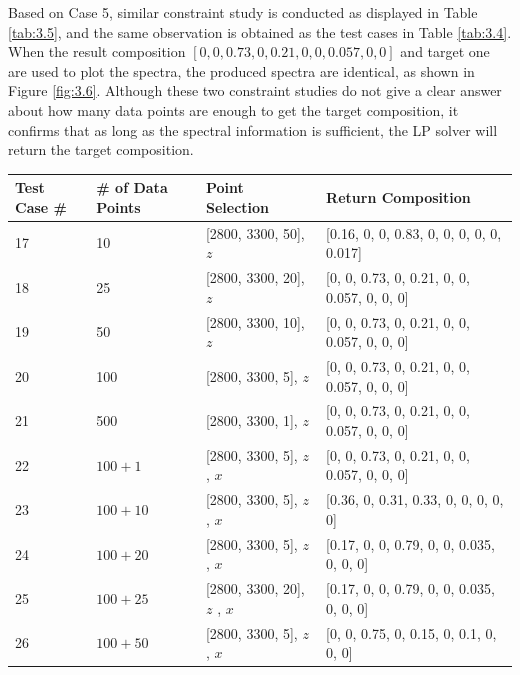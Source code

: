 Based on Case 5, similar constraint study is conducted as displayed in Table \ref{tab:3.5}, and the same observation is obtained as the test cases in Table \ref{tab:3.4}. When the result composition $[0, 0, 0.73, 0, 0.21,0, 0, 0.057, 0, 0]$ and target one are used to plot the spectra, the produced spectra are identical, as shown in Figure \ref{fig:3.6}. Although these two constraint studies do not give a clear answer about how many data points are enough to get the target composition, it confirms that as long as the spectral information is sufficient, the LP solver will return the target composition.
\begin{table} \small
\begin{center} 
{\def\arraystretch{1.5}
\begin{tabular}{| p{1cm} | p{2cm} | p{4cm}  | l |}
\hline
Test Case \# & \# of Data Points & Point Selection & Return Composition \\ \hline
17 & 10 & [2800, 3300, 50], $z$ & [0.16, 0, 0, 0.83, 0, 0, 0, 0, 0, 0.017] \\ \hline
18 & 25 & [2800, 3300, 20], $z$ & [0, 0, 0.73, 0, 0.21, 0, 0, 0.057, 0, 0, 0] \\ \hline
19 & 50 & [2800, 3300, 10], $z$ & [0, 0, 0.73, 0, 0.21, 0, 0, 0.057, 0, 0, 0] \\ \hline
20 & 100 & [2800, 3300, 5], $z$ & [0, 0, 0.73, 0, 0.21, 0, 0, 0.057, 0, 0, 0] \\ \hline
21 & 500 & [2800, 3300, 1], $z$ & [0, 0, 0.73, 0, 0.21, 0, 0, 0.057, 0, 0, 0] \\ \hline	
22 & $100 + 1$ & [2800, 3300, 5], $z$ \newline [2800, 3300, 500], $x$  & [0, 0, 0.73, 0, 0.21, 0, 0, 0.057, 0, 0, 0] \\ \hline
23 & $100 + 10$ & [2800, 3300, 5], $z$ \newline [2800, 3300, 50], $x$  & [0.36, 0, 0.31, 0.33, 0, 0, 0, 0, 0] \\ \hline
24 & $100 + 20$ & [2800, 3300, 5], $z$ \newline [2800, 3300, 25], $x$  & [0.17, 0, 0, 0.79, 0, 0, 0.035, 0, 0, 0] \\ \hline
25 & $100 + 25$ & [2800, 3300, 20], $z$ \newline [2800, 3300, 20], $x$  & [0.17, 0, 0, 0.79, 0, 0, 0.035, 0, 0, 0] \\ \hline
26 & $100 + 50$ & [2800, 3300, 5], $z$ \newline [2800, 3300, 10], $x$  & [0, 0, 0.75, 0, 0.15, 0, 0.1, 0, 0, 0] \\ \hline

\end{tabular}}
\end{center}
\end{table}
